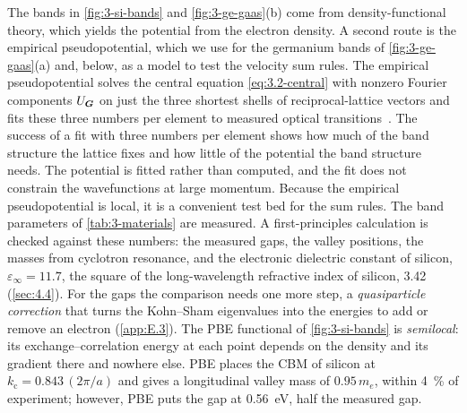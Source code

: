 The bands in \cref{fig:3-si-bands} and \cref{fig:3-ge-gaas}(b) come from density-functional theory, which yields the potential from the electron density. A second route is the empirical pseudopotential, which we use for the germanium bands of \cref{fig:3-ge-gaas}(a) and, below, as a model to test the velocity sum rules. The empirical pseudopotential solves the central equation \cref{eq:3.2-central} with nonzero Fourier components $U_{\bm{G}}$ on just the three shortest shells of reciprocal-lattice vectors and fits these three numbers per element to measured optical transitions~\cite{cohen1966band}. The success of a fit with three numbers per element shows how much of the band structure the lattice fixes and how little of the potential the band structure needs. The potential is fitted rather than computed, and the fit does not constrain the wavefunctions at large momentum. Because the empirical pseudopotential is local, it is a convenient test bed for the sum rules. The band parameters of \cref{tab:3-materials} are measured. A first-principles calculation is checked against these numbers: the measured gaps, the valley positions, the masses from cyclotron resonance, and the electronic dielectric constant of silicon, $\varepsilon_\infty = 11.7$, the square of the long-wavelength refractive index of silicon, 3.42~\cite{li1980refractive} (\cref{sec:4.4}). For the gaps the comparison needs one more step, a \emph{quasiparticle correction} that turns the Kohn--Sham eigenvalues into the energies to add or remove an electron (\cref{app:E.3}). The PBE functional of \cref{fig:3-si-bands} is \emph{semilocal}: its exchange--correlation energy at each point depends on the density and its gradient there and nowhere else. PBE places the CBM of silicon at $k_{\mathrm{c}} = 0.843\,(2\pi/a)$ and gives a longitudinal valley mass of $0.95\,m_e$, within \SI{4}{\percent} of experiment; however, PBE puts the gap at \SI{0.56}{eV}, half the measured gap.

